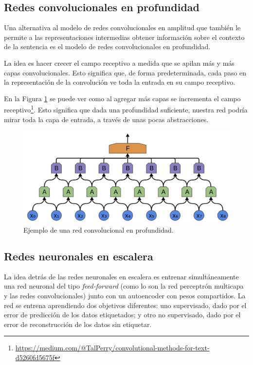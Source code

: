\subsection{Redes convolucionales en profundidad}\label{sec:cnn:deep}

Una alternativa al modelo de redes convolucionales en amplitud que también le permite a las representaciones intermedias obtener información sobre el contexto de la sentencia es el modelo de redes convolucionales en profundidad.

La idea es hacer crecer el campo receptivo a medida que se apilan más y más capas convolucionales. Esto significa que, de forma predeterminada, cada paso en la representación de la convolución ve toda la entrada en su campo receptivo.

En la Figura \ref{fig:CNN_depth_architecture} se puede ver como al agregar más capas se incrementa el campo receptivo\footnote{\url{https://medium.com/@TalPerry/convolutional-methods-for-text-d5260fd5675f}}. Esto significa que dada una profundidad suficiente, nuestra red podría mirar toda la capa de entrada, a través de unas pocas abstracciones.

\begin{figure}[hb]
\begin{center}
\includegraphics[width=.9\linewidth]{images/CNN_depth_NLP.png}
\caption{Ejemplo de una red convolucional en profundidad.}
\label{fig:CNN_depth_architecture}
\end{center}
\end{figure}

\subsection{Redes neuronales en escalera}\label{sec:ladder_net}

La idea detrás de las redes neuronales en escalera es entrenar simultáneamente una red neuronal del tipo 
\textit{feed-forward} (como lo son la red perceptrón multicapa y las redes convolucionales) junto con un 
autoencoder con pesos compartidos. La red se entrena aprendiendo dos objetivos diferentes: uno supervisado, 
dado por el error de predicción de los datos etiquetados; y otro no supervisado, dado por el error de 
reconstrucción de los datos sin etiquetar.

